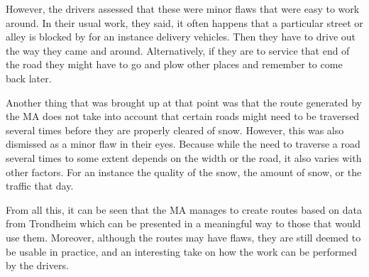 However, the drivers assessed that these were minor flaws that were easy to work around. In their usual work, they said, it often happens that a particular street or alley is blocked by for an instance delivery vehicles. Then they have to drive out the way they came and around. Alternatively, if they are to service that end of the road they might have to go and plow other places and remember to come back later.

Another thing that was brought up at that point was that the route generated by the MA does not take into account that certain roads might need to be traversed several times before they are properly cleared of snow. However, this was also dismissed as a minor flaw in their eyes. Because while the need to traverse a road several times to some extent depends on the width or the road, it also varies with other factors. For an instance the quality of the snow, the amount of snow, or the traffic that day.

From all this, it can be seen that the MA manages to create routes based on data from Trondheim which can be presented in a meaningful way to those that would use them. Moreover, although the routes may have flaws, they are still deemed to be usable in practice, and an interesting take on how the work can be performed by the drivers.

\cleardoublepage
